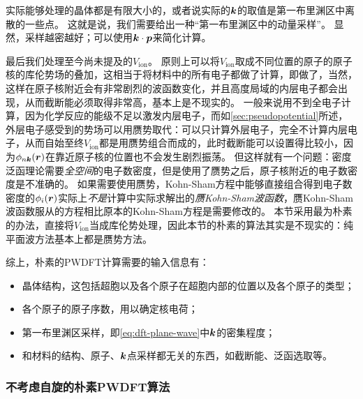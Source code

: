 实际能够处理的晶体都是有限大小的，或者说实际的$\vb*{k}$的取值是第一布里渊区中离散的一些点。
这就是说，我们需要给出一种“第一布里渊区中的动量采样”。
显然，采样越密越好；可以使用$\vb*{k} \cdot \vb*{p}$来简化计算。

最后我们处理至今尚未提及的$V_\text{ion}$。
原则上可以将$V_\text{ion}$取成不同位置的原子的原子核的库伦势场的叠加，这相当于将材料中的所有电子都做了计算，即做了，当然，这样在原子核附近会有非常剧烈的波函数变化，并且高度局域的内层电子都会出现，从而截断能必须取得非常高，基本上是不现实的。
一般来说用不到全电子计算，因为化学反应的能级不足以激发内层电子，而如\autoref{sec:pseudopotential}所述，外层电子感受到的势场可以用赝势取代：可以只计算外层电子，完全不计算内层电子，从而自始至终$V_\text{ion}$都是用赝势组合而成的，此时截断能可以设置得比较小，因为$\phi_{n \vb*{k}}(\vb*{r})$在靠近原子核的位置也不会发生剧烈振荡。
但这样就有一个问题：密度泛函理论需要\emph{全空间}的电子数密度，但是使用了赝势之后，原子核附近的电子数密度是不准确的。
如果需要使用赝势，Kohn-Sham方程中能够直接组合得到电子数密度的$\phi_i(\vb*{r})$实际上\emph{不是}计算中实际求解出的\emph{赝Kohn-Sham波函数}，赝Kohn-Sham波函数服从的方程相比原本的Kohn-Sham方程是需要修改的。
本节采用最为朴素的办法，直接将$V_\text{ion}$当成库伦势处理，因此本节的朴素的算法其实是不现实的：纯平面波方法基本上都是赝势方法。

综上，朴素的PWDFT计算需要的输入信息有：
\begin{itemize}
    \item 晶体结构，这包括超胞以及各个原子在超胞内部的位置以及各个原子的类型；
    \item 各个原子的原子序数，用以确定核电荷；
    \item 第一布里渊区采样，即\eqref{eq:dft-plane-wave}中$\vb*{k}$的密集程度；
    \item 和材料的结构、原子、$\vb*{k}$点采样都无关的东西，如截断能、泛函选取等。
\end{itemize}

\subsubsection{不考虑自旋的朴素PWDFT算法}

